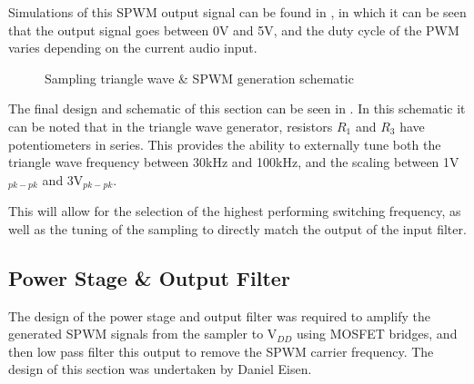 \documentclass[a4paper,11pt]{article}
\begin{document}
Simulations of this SPWM output signal can be found in , in which it can be seen that the output signal goes between 0V and 5V, and the duty cycle of the PWM varies depending on the current audio input.

\begin{figure}[h!]
    \centering
    \caption{Sampling triangle wave \& SPWM generation schematic}
    \label{F:sampling_schematic}
\end{figure}

The final design and schematic of this section can be seen in . In this schematic it can be noted that in the triangle wave generator, resistors $R_1$ and $R_3$ have potentiometers in series. This provides the ability to externally tune both the triangle wave frequency between 30kHz and 100kHz, and the scaling between 1V$_{pk-pk}$ and 3V$_{pk-pk}$. 

This will allow for the selection of the highest performing switching frequency, as well as the tuning of the sampling to directly match the output of the input filter. 


\subsection{Power Stage \& Output Filter}

The design of the power stage and output filter was required to amplify the generated SPWM signals from the sampler to V$_{DD}$ using MOSFET bridges, and then low pass filter this output to remove the SPWM carrier frequency. The design of this section was undertaken by Daniel Eisen.\\
\end{document}
